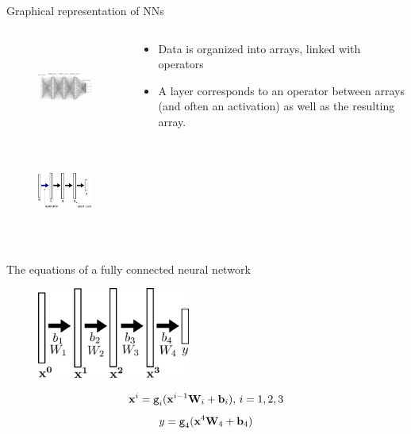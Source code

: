 \documentclass[xcolor=pdftex,dvipsnames,table,mathserif]{beamer}
\begin{document}
\begin{frame}{Graphical representation of NNs}

\begin{columns}
  \begin{column}{.5\textwidth}
    \begin{figure}
      \includegraphics[height=3cm]{../graphics/network.png}
    \end{figure}
    \begin{figure}
      \includegraphics[height=3cm]{../graphics/nn_representation}
    \end{figure}
  \end{column}

  \begin{column}{.5\textwidth}
    \begin{itemize}
    \item Data is organized into arrays, linked with operators
    \item A layer corresponds to an operator between arrays (and often an activation) as well as the resulting array.
    \end{itemize}
  \end{column}
\end{columns}


\end{frame}


\begin{frame}{The equations of a fully connected neural network}

    \begin{figure}
      \includegraphics[height=3cm]{../graphics/nn_representation2}
    \end{figure}

    \begin{block}{}
      \[\mathbf{x}^i = \texttt{g}_i(\mathbf{x}^{i-1}\mathbf{W}_i + \mathbf{b}_i),\, i= 1, 2, 3 \]
      \[y = \texttt{g}_4(\mathbf{x}^4\mathbf{W}_4 + \mathbf{b}_4)\]
    \end{block}

\end{frame}
\end{document}

